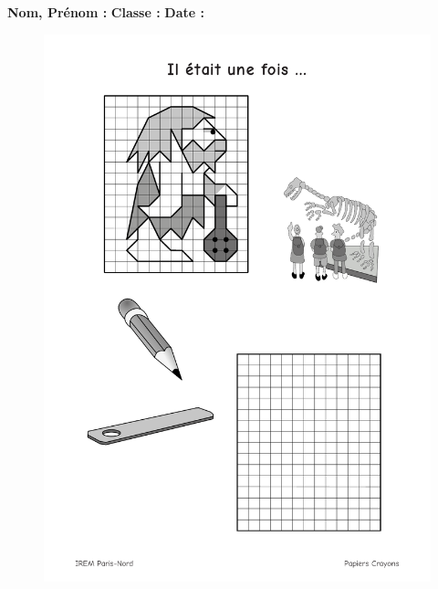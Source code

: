 



\textbf{Nom, Prénom :} \hspace{8cm} \textbf{Classe :} \hspace{3cm} \textbf{Date :}\\

\begin{figure}[H]
  \centering
  \includegraphics[width=0.8\linewidth]{6xDM/iletaitunefois.pdf}
\end{figure}

\newpage

